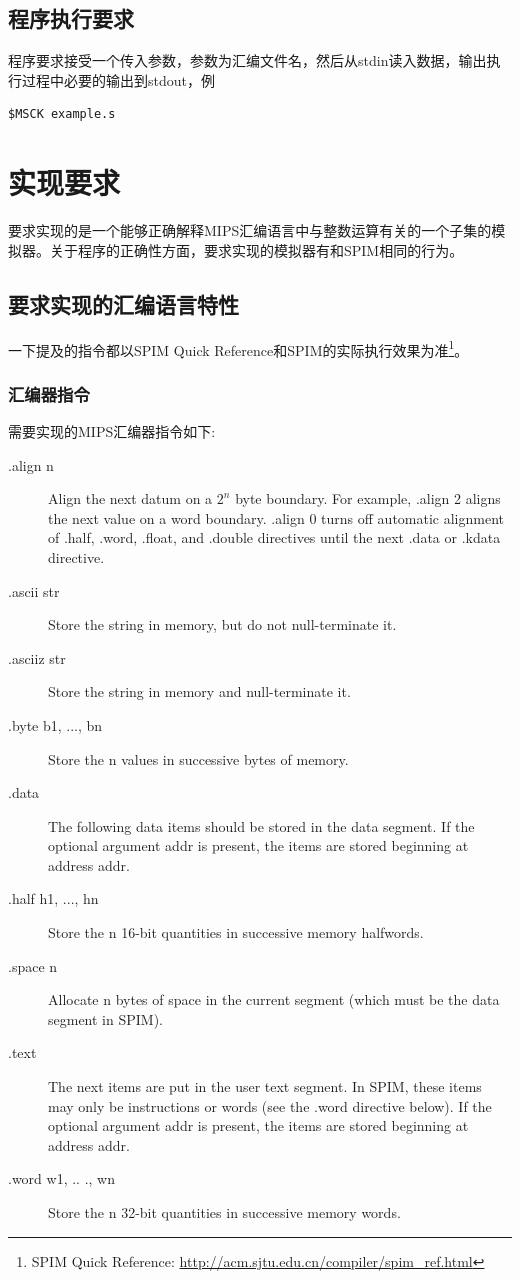 \documentclass[a4paper, 11pt]{article}
\begin{document}
\subsection{程序执行要求}
	程序要求接受一个传入参数，参数为汇编文件名，然后从stdin读入数据，输出执行过程中必要的输出到stdout，例
\begin{lstlisting}[frame=single]
$MSCK example.s
\end{lstlisting}
	
\section{实现要求}
要求实现的是一个能够正确解释MIPS汇编语言中与整数运算有关的一个子集的模拟器。关于程序的正确性方面，要求实现的模拟器有和SPIM相同的行为。
\subsection{要求实现的汇编语言特性}
	一下提及的指令都以SPIM Quick Reference和SPIM的实际执行效果为准\footnote{SPIM Quick Reference: \url{http://acm.sjtu.edu.cn/compiler/spim_ref.html}}。
\subsubsection{汇编器指令}
	需要实现的MIPS汇编器指令如下:
	\begin{description}
		\item[.align n]
			Align the next datum on a $ 2^n $ byte boundary. For example, .align 2 aligns the next value on a word boundary. .align 0 turns off automatic alignment of .half, .word, .float, and .double directives until the next .data or .kdata directive.
		\item[.ascii str]
			Store the string in memory, but do not null-terminate it.
		\item[.asciiz str]
			Store the string in memory and null-terminate it.
		\item[.byte b1, ..., bn]
			Store the n values in successive bytes of memory.
		\item[.data]
			The following data items should be stored in the data segment. If the optional argument addr is present, the items are stored beginning at address addr.
		\item[.half h1, ..., hn]
			Store the n 16-bit quantities in successive memory halfwords.
		\item[.space n]
			Allocate n bytes of space in the current segment (which must be the data segment in SPIM).
		\item[.text]
			The next items are put in the user text segment. In SPIM, these items may only be instructions or words (see the .word directive below). If the optional argument addr is present, the items are stored beginning at address addr.
		\item[.word w1, ..	., wn]
Store the n 32-bit quantities in successive memory words.
	\end{description}
\end{document}
